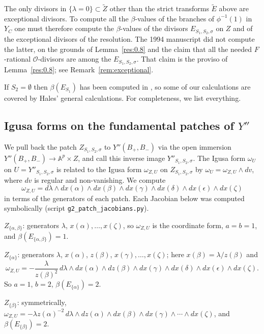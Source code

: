 \documentclass[12pt,letterpaper]{amsart}
\theoremstyle{plain}
\theoremstyle{definition}
\theoremstyle{remark}
\theoremstyle{definition}
\newcommand{\aaa}{\mathbb{A}}
\begin{document}
The only divisors in $\{\lambda =0\}\subset \tilde{Z}$ other than the strict
transforms $\tilde{E}$ above are exceptional divisors.
To compute all the $\beta$-values of the
branches of $\phi^{-1}(1)$ in $Y_C$ one must therefore compute the
$\beta$-values of the divisors $E_{S_1,S_2,\sigma}$ on $Z$ and of the
exceptional divisors of the resolution. The 1994 manuscript did not compute
the latter, on the grounds of Lemma~\ref{res:0.8} and the claim that all the
needed $F$-rational $\mathcal O$-divisors are among the $E_{S_1,S_2,\sigma}$.
That claim is the proviso of Lemma~\ref{res:0.8}; see
Remark~\ref{rem:exceptional}.

If $S_2=\emptyset$ then $\beta({E}_{S_1})$
has been computed in \cite[Ch.~II, Proposition~9.1]{Ha92a},
so some of our calculations are covered by Hales' general
calculations. For completeness, we list everything.

\subsection*{Igusa forms on the fundamental patches of \texorpdfstring{$Y''$}{Y''}}

We pull back the patch $Z_{S_1,S_2,\sigma}$
to $Y''(B_+,B_-)$ via the open immersion
$Y''(B_+,B_-)\rightarrow \aaa^p\times Z$, and call this inverse image
$Y''_{S_1,S_2,\sigma}$. The Igusa form $\omega_U$ on $U=Y''_{S_1,S_2,\sigma}$
is related to the Igusa form $\omega_{Z,U}$ on $Z_{S_1,S_2,\sigma}$ by
$\omega_U=\omega_{Z,U}\wedge dv$, where $dv$ is regular and non-vanishing.
We compute
\[
\omega_{Z,U}=d\lambda\wedge dx(\alpha)\wedge dx(\beta)\wedge dx(\gamma)
\wedge dx(\delta)\wedge dx(\epsilon)\wedge dx(\zeta)
\]
in terms of the generators of each patch. Each Jacobian below was computed
symbolically (script \texttt{g2\_patch\_jacobians.py}).

\medskip
$Z_{\{\alpha,\beta\}}$: generators $\lambda$, $x(\alpha),\dots,x(\zeta)$, so
$\omega_{Z,U}$ is the coordinate form, $a=b=1$, and
$\beta(E_{\{\alpha,\beta\}})=1$.

\medskip
$Z_{\{\alpha\}}$: generators $\lambda$, $x(\alpha)$, $z(\beta)$,
$x(\gamma),\dots,x(\zeta)$; here $x(\beta)=\lambda/z(\beta)$ and
\[
\omega_{Z,U}=-\frac{\lambda}{z(\beta)^2}\,
d\lambda\wedge dx(\alpha)\wedge dz(\beta)\wedge dx(\gamma)
\wedge dx(\delta)\wedge dx(\epsilon)\wedge dx(\zeta).
\]
So $a=1$, $b=2$, $\beta(E_{\{\alpha\}})=2$.

\medskip
$Z_{\{\beta\}}$: symmetrically,
$\omega_{Z,U}=-\lambda z(\alpha)^{-2}\,
d\lambda\wedge dz(\alpha)\wedge dx(\beta)\wedge dx(\gamma)
\wedge\cdots\wedge dx(\zeta)$, and $\beta(E_{\{\beta\}})=2$.
\end{document}
